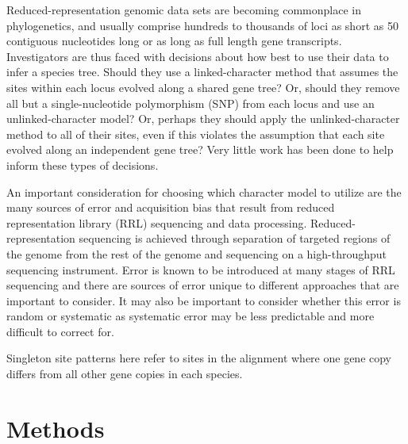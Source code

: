 Reduced-representation genomic data sets are becoming commonplace in phylogenetics, and usually comprise hundreds to thousands of loci as short as 50 contiguous nucleotides long or as long as full length gene transcripts. Investigators are thus faced with decisions about how best to use their data to infer a species tree. Should they use a linked-character method that assumes the sites within each locus evolved along a shared gene tree? Or, should they remove all but a single-nucleotide polymorphism (SNP) from each locus and use an unlinked-character model? Or, perhaps they should apply the unlinked-character method to all of their sites, even if this violates the assumption that each site evolved along an independent gene tree? Very little work has been done to help inform these types of decisions. 

An important consideration for choosing which character model to utilize are the many sources of error and acquisition bias that result from reduced representation library (RRL) sequencing and data processing.  Reduced-representation sequencing is achieved through separation of targeted regions of the genome from the rest of the genome and sequencing on a high-throughput sequencing instrument. Error is known to be introduced at many stages of RRL sequencing and there are sources of error unique to different approaches that are important to consider. It may also be important to consider whether this error is random or systematic as systematic error may be less predictable and more difficult to correct for. 
	
Singleton site patterns here refer to sites in the alignment where one gene copy differs from all other gene copies in each species.


\section{Methods}
